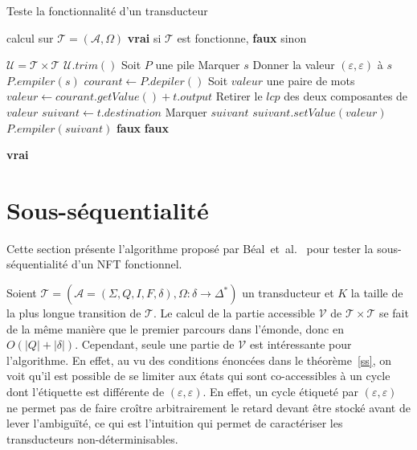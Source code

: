	
	
	\begin{algorithm}
		\caption{Teste la fonctionnalité d'un transducteur}
		\label{algofunc}
		\begin{algorithmic}[1]
			\Require calcul sur $\mathscr{T} = (\mathscr{A},\Omega)$
			\Ensure \textbf{vrai} si $\mathscr{T}$ est fonctionne, \textbf{faux} sinon
			
			\Statex
			\State $\mathscr{U} = \mathscr{T} \times \mathscr{T}$
			\State $\mathscr{U}.trim()$
			\State Soit $P$ une pile
					\State Marquer $s$
					\State Donner la valeur $(\varepsilon,\varepsilon)$ à $s$
					\State $P.empiler(s)$
				\EndIf
			\EndFor
			\Statex
				\State $courant \gets P.depiler()$
					\State Soit $valeur$ une paire de mots
					\State $valeur \gets courant.getValue() + t.output$
					\State Retirer le $lcp$ des deux composantes de $valeur$
					\State $suivant \gets t.destination$
						\State Marquer $suivant$
						\State $suivant.setValue(valeur)$
						\State $P.empiler(suivant)$
						\State \Return \textbf{faux}
						\State \Return \textbf{faux}
					\EndIf
					
					\Return \textbf{vrai}
				\EndFor
			\EndWhile		
		\end{algorithmic}
	\end{algorithm}
	
\section{Sous-séquentialité}
\label{subsequential}

		Cette section présente l'algorithme proposé par Béal~et~al.~\cite{Bea03}  pour tester la sous-séquentialité d'un NFT fonctionnel.
		
		Soient $\mathscr{T} = (\mathscr{A} = (\Sigma, Q, I, F, \delta), \Omega: \delta \to \Delta^*)$ un transducteur et $K$ la taille de la plus longue transition de $\mathscr{T}$. Le calcul de la partie accessible $\mathscr{V}$ de $\mathscr{T} \times \mathscr{T}$ se fait de la même manière que le premier parcours dans l'émonde, donc en $O(|Q| + |\delta|)$. Cependant, seule une partie de $\mathscr{V}$ est intéressante pour l'algorithme. En effet, au vu des conditions énoncées dans le théorème~\ref{ss}, on voit qu'il est possible de se limiter aux états qui sont co-accessibles à un cycle dont l'étiquette est différente de $(\varepsilon,\varepsilon)$. En effet, un cycle étiqueté par $(\varepsilon,\varepsilon)$ ne permet pas de faire croître arbitrairement le retard devant être stocké avant de lever l'ambiguïté, ce qui est l'intuition qui permet de caractériser les transducteurs non-déterminisables.
		
